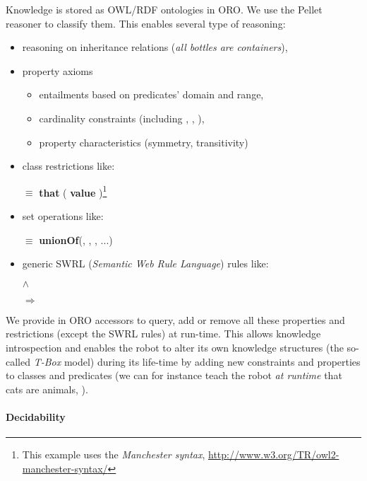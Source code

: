 Knowledge is stored as OWL/RDF ontologies in ORO. We use the Pellet reasoner to
classify them. This enables several type of reasoning:

\begin{itemize}
	\item reasoning on inheritance relations (\eg \emph{all bottles are containers}),
	\item property axioms
		\begin{itemize}
		\item entailments based on predicates' domain and range,
		\item cardinality constraints (including , 
		, ),
		\item property characteristics (symmetry, transitivity)
		\end{itemize}
	\item class restrictions like: \par \footnotesize {} $\equiv$
		 {\bf that} ( {\bf value}
		)\footnote{This example uses the \emph{Manchester
		syntax}, \url{http://www.w3.org/TR/owl2-manchester-syntax/}} \normalsize
	\item set operations like: \par \footnotesize {} $\equiv$ {\bf unionOf}(,
		, , ...) \normalsize
	\item generic SWRL ({\em Semantic Web Rule Language}) rules like: \par
		\footnotesize {} $\land$
		 \par $\Rightarrow$ 
		\normalsize 
	\end{itemize}

We provide in ORO accessors to query, add or remove all these properties and
restrictions (except the SWRL rules) at run-time. This allows knowledge
introspection and enables the robot to alter its own knowledge structures (the
so-called \emph{T-Box} model) during its life-time by adding new constraints
and properties to classes and predicates (we can for instance teach the robot
\emph{at runtime} that cats are animals, \ie {}).



\paragraph{Decidability}

